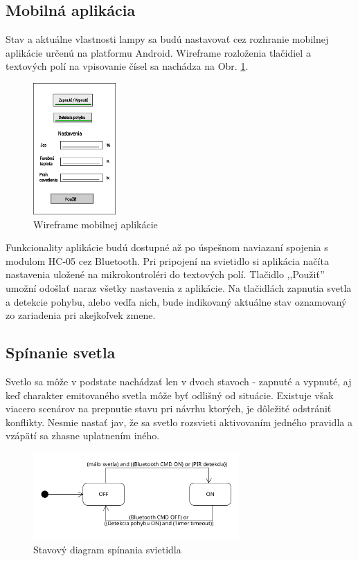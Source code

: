 \documentclass[12pt, a4paper]{article}
\begin{document}
\subsection{Mobilná aplikácia}
Stav a aktuálne vlastnosti lampy sa budú nastavovať cez rozhranie mobilnej aplikácie  určenú na platformu Android. Wireframe rozloženia tlačidiel a textových polí na vpisovanie čísel sa nachádza na Obr. \ref{fig:app-wireframe}.
\begin{figure}[h]
	\centering
	\includegraphics[width=0.28\textwidth]{assets/wireframe.png}
	\caption{Wireframe mobilnej aplikácie}
	\label{fig:app-wireframe}
\end{figure}

Funkcionality aplikácie budú dostupné až po úspešnom naviazaní spojenia s modulom HC-05 cez Bluetooth. Pri pripojení na svietidlo si aplikácia načíta nastavenia uložené na mikrokontroléri do textových polí. Tlačidlo ,,Použiť'' umožní odošlať naraz všetky nastavenia z aplikácie. Na tlačidlách zapnutia svetla a detekcie pohybu, alebo vedľa nich, bude indikovaný aktuálne stav oznamovaný zo zariadenia pri akejkoľvek zmene.
\FloatBarrier

\subsection{Spínanie svetla}
Svetlo sa môže v podstate nachádzať len v dvoch stavoch - zapnuté a vypnuté, aj keď charakter emitovaného svetla môže byť odlišný od situácie. Existuje však viacero scenárov na prepnutie stavu pri návrhu ktorých, je dôležité odstrániť konflikty. Nesmie nastať jav, že sa svetlo rozsvieti aktivovaním jedného pravidla a vzápätí sa zhasne uplatnením iného.
\begin{figure}[h]
    \centering
	\includegraphics[width=0.7\textwidth]{assets/light-states.png}
	\caption{Stavový diagram spínania svietidla}
	\label{fig:state-diagram-switch}
\end{figure}
\end{document}
